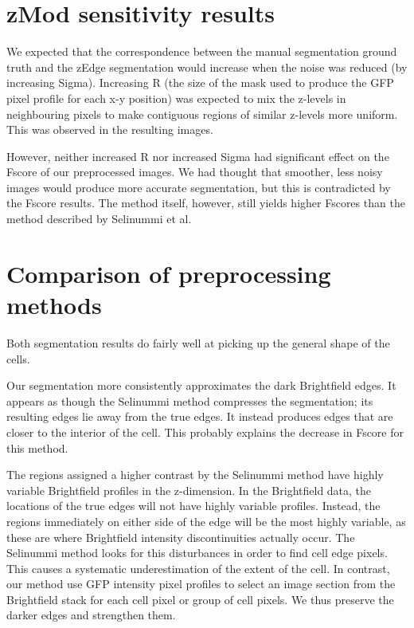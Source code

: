 \section{zMod sensitivity results}


We expected that the correspondence between the manual segmentation ground truth and the zEdge segmentation would increase when the noise was reduced (by increasing Sigma). Increasing R (the size of the mask used to produce the GFP pixel profile for each x-y position) was expected to mix the z-levels in neighbouring pixels to make contiguous regions of similar z-levels more uniform. This was observed in the resulting images.

However, neither increased R nor increased Sigma had significant effect on the Fscore of our preprocessed images. We had thought that smoother, less noisy images would produce more accurate segmentation, but this is contradicted by the Fscore results. The method itself, however, still yields higher Fscores than the method described by Selinummi et al.

\section{Comparison of preprocessing methods}


Both segmentation results do fairly well at picking up the general shape of the cells.

Our segmentation more consistently approximates the dark Brightfield edges. It appears as though the Selinummi method compresses the segmentation; its resulting edges lie away from the true edges. It instead produces edges that are closer to the interior of the cell. This probably explains the decrease in Fscore for this method.

The regions assigned a higher contrast by the Selinummi method have highly variable Brightfield profiles in the z-dimension. In the Brightfield data, the locations of the true edges will not have highly variable profiles. Instead, the regions immediately on either side of the edge will be the most highly variable, as these are where Brightfield intensity discontinuities actually occur. The Selinummi method looks for this disturbances in order to find cell edge pixels. This causes a systematic underestimation of the extent of the cell. In contrast, our method use GFP intensity pixel profiles to select an image section from the Brightfield stack for each cell pixel or group of cell pixels. We thus preserve the darker edges and strengthen them. 
